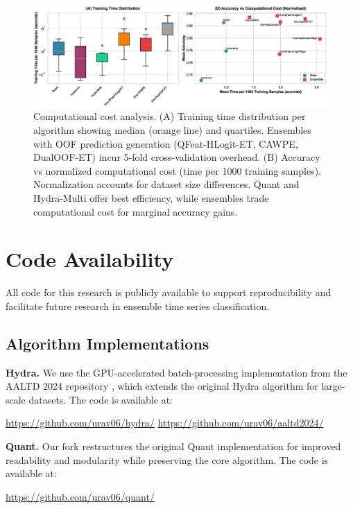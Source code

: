 \documentclass[pdflatex,sn-basic]{sn-jnl}           %
\theoremstyle{thmstyleone}%
\theoremstyle{thmstyletwo}%
\theoremstyle{thmstylethree}%
\begin{document}
\begin{appendices}
\begin{figure}[!htb]
\centering
\includegraphics[width=\textwidth]{figureA2_computational_cost}
\caption{Computational cost analysis. (A) Training time distribution per algorithm showing median (orange line) and quartiles. Ensembles with OOF prediction generation (QFeat-HLogit-ET, CAWPE, DualOOF-ET) incur 5-fold cross-validation overhead. (B) Accuracy vs normalized computational cost (time per 1000 training samples). Normalization accounts for dataset size differences. Quant and Hydra-Multi offer best efficiency, while ensembles trade computational cost for marginal accuracy gains.}\label{fig:computational}
\end{figure}

\clearpage

\section{Code Availability}\label{appF}

All code for this research is publicly available to support reproducibility and facilitate future research in ensemble time series classification.

\subsection{Algorithm Implementations}

\noindent\textbf{Hydra.} We use the GPU-accelerated batch-processing implementation from the AALTD 2024 repository \citep{highly-scalable}, which extends the original Hydra algorithm for large-scale datasets. The code is available at:

\url{https://github.com/urav06/hydra/}
\url{https://github.com/urav06/aaltd2024/}

\noindent\textbf{Quant.} Our fork restructures the original Quant implementation for improved readability and modularity while preserving the core algorithm. The code is available at:

\url{https://github.com/urav06/quant/}


\end{appendices}
\end{document}

